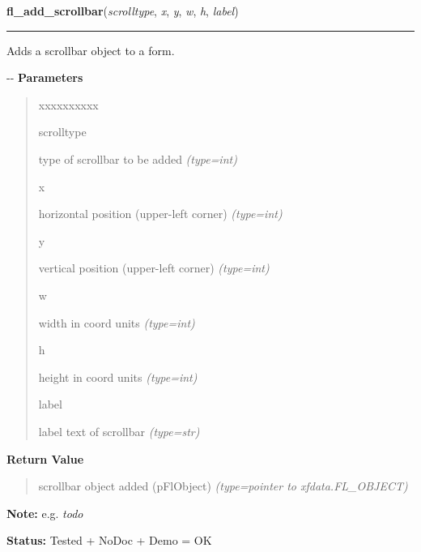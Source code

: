     \vspace{0.5ex}

\hspace{.8\funcindent}\begin{boxedminipage}{\funcwidth}

    \raggedright \textbf{fl\_add\_scrollbar}(\textit{scrolltype}, \textit{x}, \textit{y}, \textit{w}, \textit{h}, \textit{label})

    \vspace{-1.5ex}

    \rule{\textwidth}{0.5\fboxrule}
\setlength{\parskip}{2ex}

Adds a scrollbar object to a form.

-{}-
\setlength{\parskip}{1ex}
      \textbf{Parameters}
      \vspace{-1ex}

      \begin{quote}
        \begin{Ventry}{xxxxxxxxxx}

          \item[scrolltype]


type of scrollbar to be added
            {\it (type=int)}

          \item[x]


horizontal position (upper-left corner)
            {\it (type=int)}

          \item[y]


vertical position (upper-left corner)
            {\it (type=int)}

          \item[w]


width in coord units
            {\it (type=int)}

          \item[h]


height in coord units
            {\it (type=int)}

          \item[label]


label text of scrollbar
            {\it (type=str)}

        \end{Ventry}

      \end{quote}

      \textbf{Return Value}
    \vspace{-1ex}

      \begin{quote}

scrollbar object added (pFlObject)
      {\it (type=pointer to xfdata.FL\_OBJECT)}

      \end{quote}

\textbf{Note:} 
e.g. \emph{todo}


\textbf{Status:} 
Tested + NoDoc + Demo = OK


    \end{boxedminipage}


